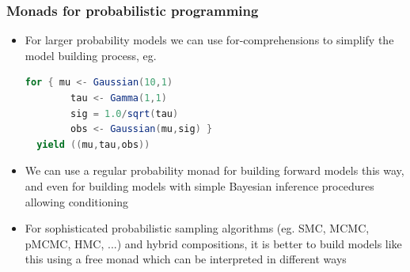 \documentclass[mathserif,handout]{beamer}
\begin{document}
\begin{frame}[fragile]
  \frametitle{Monads for probabilistic programming}
  \begin{itemize}
    \item For larger probability models we can use \alert{for-comprehensions} to simplify the model building process, eg.
\begin{lstlisting}[language=scala]
  for { mu <- Gaussian(10,1)
        tau <- Gamma(1,1)
        sig = 1.0/sqrt(tau)
        obs <- Gaussian(mu,sig) }
  yield ((mu,tau,obs))
\end{lstlisting}
  \item We can use a regular probability monad for building forward models this way, and even for building models with simple Bayesian inference procedures allowing conditioning
    \item For sophisticated probabilistic sampling algorithms (eg. SMC, MCMC, pMCMC, HMC, ...) and hybrid compositions, it is better to build models like this using a \alert{free monad} which can be \alert{interpreted} in different ways
  \end{itemize}
\end{frame}

\end{document}
